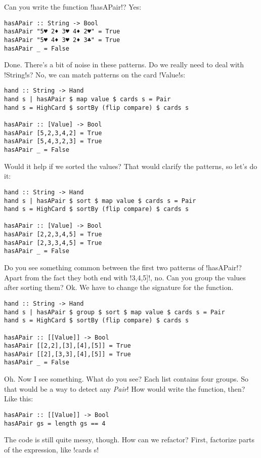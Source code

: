 \lhN Can you write the function \il!hasAPair!?
\lhA Yes:
\begin{lstlisting}[frame=single]
hasAPair :: String -> Bool
hasAPair "5♥ 2♦ 3♥ 4♦ 2♥" = True 
hasAPair "5♥ 4♦ 3♥ 2♦ 3♣" = True
hasAPair _ = False
\end{lstlisting}
\success Done.
\lhN There's a bit of noise in these patterns. Do we really need to deal with \il!String!s?
\lhA \success No, we can match patterns on the card \il!Value!s:
\begin{lstlisting}[frame=single]
hand :: String -> Hand
hand s | hasAPair $ map value $ cards s = Pair
hand s = HighCard $ sortBy (flip compare) $ cards s

hasAPair :: [Value] -> Bool
hasAPair [5,2,3,4,2] = True 
hasAPair [5,4,3,2,3] = True
hasAPair _ = False
\end{lstlisting}
\lhN Would it help if we sorted the values?
\lhA \success That would clarify the patterns, so let's do it:
\begin{lstlisting}[frame=single]
hand :: String -> Hand
hand s | hasAPair $ sort $ map value $ cards s = Pair
hand s = HighCard $ sortBy (flip compare) $ cards s

hasAPair :: [Value] -> Bool
hasAPair [2,2,3,4,5] = True 
hasAPair [2,3,3,4,5] = True
hasAPair _ = False
\end{lstlisting} %
\lhN Do you see something common between the first two patterns of \il!hasAPair!?
\lhA Apart from the fact they both end with \il!3,4,5]!, no.
\lhN Can you group the values after sorting them?
\lhA \success Ok. We have to change the signature for the function.
\begin{lstlisting}[frame=single]
hand :: String -> Hand
hand s | hasAPair $ group $ sort $ map value $ cards s = Pair
hand s = HighCard $ sortBy (flip compare) $ cards s

hasAPair :: [[Value]] -> Bool
hasAPair [[2,2],[3],[4],[5]] = True 
hasAPair [[2],[3,3],[4],[5]] = True
hasAPair _ = False
\end{lstlisting}
\success Oh. Now I see something.
\lhN What do you see?
\lhA Each list contains four groups. So that would be a way to detect any \emph{Pair}!
\lhN How would write the function, then?
\lhA \success Like this:
\begin{lstlisting}[frame=single]
hasAPair :: [[Value]] -> Bool
hasAPair gs = length gs == 4 
\end{lstlisting}
\success The code is still quite messy, though.
\lhN How can we refactor?
\lhA First, factorize parts of the expression, like \il!cards s!   

